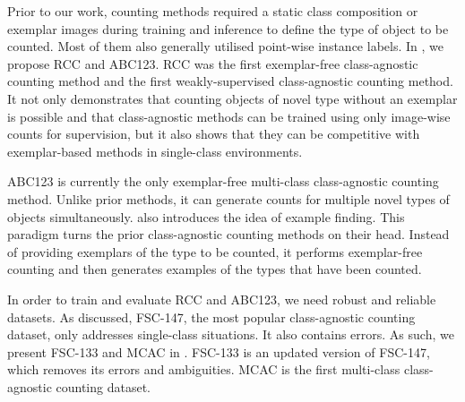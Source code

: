 \documentclass[../thesis.tex]{subfiles}
\begin{document}
Prior to our work, counting methods required a static class composition or exemplar images during training and inference to define the type of object to be counted. Most of them also generally utilised point-wise instance labels.
In , we propose RCC and ABC123. RCC was the first exemplar-free class-agnostic counting method and the first weakly-supervised class-agnostic counting method. 
It not only demonstrates that counting objects of novel type without an exemplar is possible and that class-agnostic methods can be trained using only image-wise counts for supervision, but it also shows that they can be competitive with exemplar-based methods in single-class environments.

ABC123 is currently the only exemplar-free multi-class class-agnostic counting method. Unlike prior methods, it can generate counts for multiple novel types of objects simultaneously. 
 also introduces the idea of example finding. This paradigm turns the prior class-agnostic counting methods on their head. Instead of providing exemplars of the type to be counted, it performs exemplar-free counting and then generates examples of the types that have been counted.

In order to train and evaluate RCC and ABC123, we need robust and reliable datasets.
As discussed, FSC-147, the most popular class-agnostic counting dataset, only addresses single-class situations. 
It also contains errors.
As such, we present FSC-133 and MCAC in .
FSC-133 is an updated version of FSC-147, which removes its errors and ambiguities. 
MCAC is the first multi-class class-agnostic counting dataset.
\end{document}
